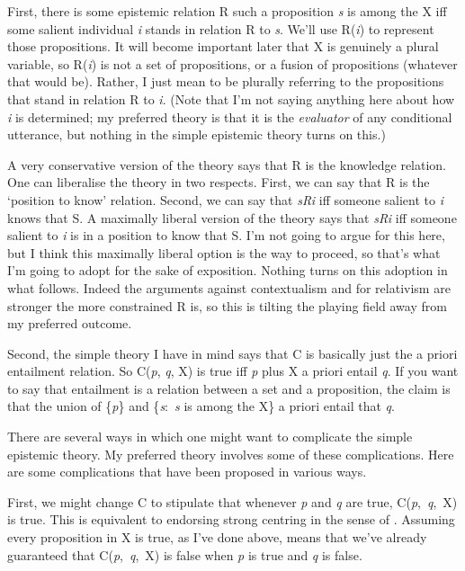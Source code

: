 First, there is some epistemic relation R such a proposition \textit{s} is among the X iff some salient individual \textit{i} stands in relation R to \textit{s}. We'll use R(\textit{i}) to represent those propositions. It will become important later that X is genuinely a plural variable, so R(\textit{i}) is not a set of propositions, or a fusion of propositions (whatever that would be). Rather, I just mean to be plurally referring to the propositions that stand in relation R to \textit{i}. (Note that I'm not saying anything here about how \textit{i} is determined; my preferred theory is that it is the \textit{evaluator} of any conditional utterance, but nothing in the simple epistemic theory turns on this.)

A very conservative version of the theory says that R is the knowledge relation. One can liberalise the theory in two respects. First, we can say that R is the `position to know' relation. Second, we can say that \textit{sRi} iff someone salient to \textit{i} knows that S. A maximally liberal version of the theory says that \textit{sRi} iff someone salient to \textit{i} is in a position to know that S. I'm not going to argue for this here, but I think this maximally liberal option is the way to proceed, so that's what I'm going to adopt for the sake of exposition. Nothing turns on this adoption in what follows. Indeed the arguments against contextualism and for relativism are stronger the more constrained R is, so this is tilting the playing field away from my preferred outcome.

Second, the simple theory I have in mind says that C is basically just the a priori entailment relation. So C(\textit{p}, \textit{q}, X) is true iff \textit{p} plus X a priori entail \textit{q}. If you want to say that entailment is a relation between a set and a proposition, the claim is that the union of \{\textit{p}\} and \{\textit{s}:~\textit{s }is among the X\} a priori entail that \textit{q}.

There are several ways in which one might want to complicate the simple epistemic theory. My preferred theory involves some of these complications. Here are some complications that have been proposed in various ways.

First, we might change C to stipulate that whenever \textit{p} and \textit{q} are true, C(\textit{p},~\textit{q},~X) is true. This is equivalent to endorsing strong centring in the sense of \citet{Lewis1973a}. Assuming every proposition in X is true, as I've done above, means that we've already guaranteed that C(\textit{p},~\textit{q},~X) is false when \textit{p} is true and \textit{q} is false.

